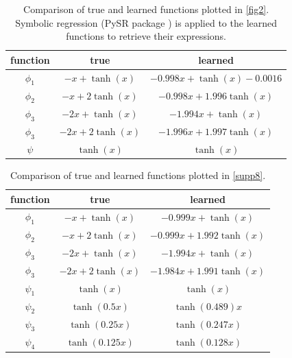 \documentclass[10pt,twocolumn]{article}
\begin{document}
\clearpage
\twocolumn

\begin{table}[h]
\centering
\footnotesize
\begin{tabular}{|c|c|c|}
\hline
\textbf{function} & \textbf{true} & \textbf{learned} \\
\hline
$\phi_1$ & $-x + \tanh (x)$ & $-0.998x +\tanh (x) - 0.0016$ \\
\hline
$\phi_2$ & $-x + 2\tanh (x)$ & $-0.998x +1.996\tanh (x)$ \\
\hline
$\phi_3$ & $-2x + \tanh (x)$ & $-1.994x +\tanh (x)$ \\
\hline
$\phi_3$ & $-2x + 2\tanh (x)$ & $-1.996x +1.997\tanh (x)$ \\
\hline
$\psi$ & $\tanh (x)$ & $\tanh (x)$ \\
\hline
\end{tabular}
\caption{Comparison of true and learned functions plotted in \cref{fig2}. Symbolic regression (PySR package \citep{cranmer_interpretable_2023}) is applied to the learned functions to retrieve their expressions.}
\label{table1}
\end{table}

\begin{table}[h]
\centering
\footnotesize
\begin{tabular}{|c|c|c|}
\hline
\textbf{function} & \textbf{true} & \textbf{learned} \\
\hline
$\phi_1$ & $-x + \tanh (x)$ & $-0.999x +\tanh (x)$ \\
\hline
$\phi_2$ & $-x + 2\tanh (x)$ & $-0.999x +1.992\tanh (x)$ \\
\hline
$\phi_3$ & $-2x + \tanh (x)$ & $-1.994x +\tanh (x)$ \\
\hline
$\phi_3$ & $-2x + 2\tanh (x)$ & $-1.984x +1.991\tanh (x)$ \\
\hline
$\psi_1$ & $\tanh (x)$ & $\tanh (x)$ \\
\hline
$\psi_2$ & $\tanh (0.5x)$ & $\tanh (0.489)x$ \\
\hline
$\psi_3$ & $\tanh (0.25x)$ & $\tanh (0.247x)$ \\
\hline
$\psi_4$ & $\tanh (0.125x)$ & $\tanh (0.128x)$ \\
\hline
\end{tabular}
\caption{Comparison of true and learned functions plotted in \cref{supp8}.}
\label{table2}
\end{table}
\end{document}
